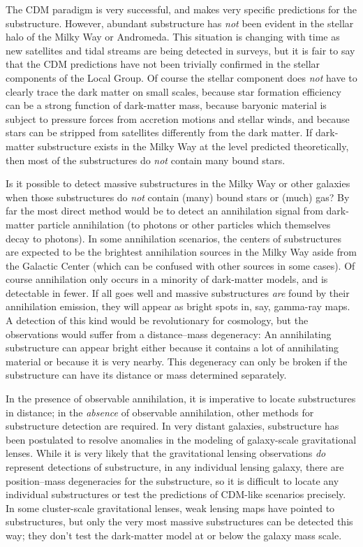 \documentclass[12pt,preprint]{aastex}
\begin{document}
The CDM paradigm is very successful, and makes very specific
predictions for the substructure.  However, abundant substructure has
\emph{not} been evident in the stellar halo of the Milky Way or
Andromeda.  This situation is changing with time as new satellites and
tidal streams are being detected in surveys, but it is fair to say
that the CDM predictions have not been trivially confirmed in the
stellar components of the Local Group.  Of course the stellar
component does \emph{not} have to clearly trace the dark matter on
small scales, because star formation efficiency can be a strong
function of dark-matter mass, because baryonic material is subject to
pressure forces from accretion motions and stellar winds, and because
stars can be stripped from satellites differently from the dark
matter.  If dark-matter substructure exists in the Milky Way at the
level predicted theoretically, then most of the substructures do
\emph{not} contain many bound stars.

Is it possible to detect massive substructures in the Milky Way or
other galaxies when those substructures do \emph{not} contain (many)
bound stars or (much) gas?  By far the most direct method would be to
detect an annihilation signal from dark-matter particle annihilation
(to photons or other particles which themselves decay to photons).  In
some annihilation scenarios, the centers of substructures are expected
to be the brightest annihilation sources in the Milky Way aside from
the Galactic Center (which can be confused with other sources in some
cases).  Of course annihilation only occurs in a minority of dark-matter
models, and is detectable in fewer.  If all goes well and massive
substructures \emph{are} found by their annihilation emission, they
will appear as bright spots in, say, gamma-ray maps.  A detection of
this kind would be revolutionary for cosmology, but
the observations would suffer from a distance--mass degeneracy: An
annihilating substructure can appear bright either because it contains
a lot of annihilating material or because it is very nearby.  This
degeneracy can only be broken if the substructure can have its
distance or mass determined separately.

In the presence of observable annihilation, it is imperative to locate
substructures in distance; in the \emph{absence} of observable
annihilation, other methods for substructure detection are required.
In very distant galaxies, substructure has been postulated to resolve
anomalies in the modeling of galaxy-scale gravitational lenses.  While
it is very likely that the gravitational lensing observations
\emph{do} represent detections of substructure, in any individual
lensing galaxy, there are position--mass degeneracies for the
substructure, so it is difficult to locate any individual
substructures or test the predictions of CDM-like scenarios precisely.
In some cluster-scale gravitational lenses, weak lensing maps have
pointed to substructures, but only the very most massive substructures
can be detected this way; they don't test the dark-matter model at or
below the galaxy mass scale.
\end{document}
